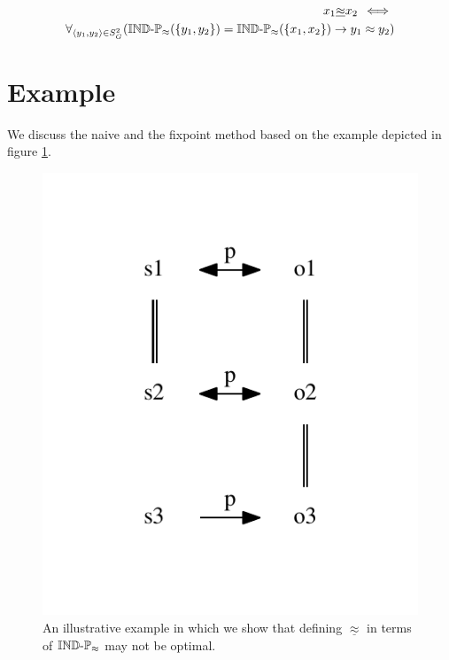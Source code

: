 \documentclass[a4paper]{article}
\begin{document}
\begin{definition}
\begin{align}
\label{def:lower_approximation1}
  x_1 \underline{\approx} x_2
\, \iff \,\\
  \forall_{\langle y_1,y_2\rangle \in S_G^2}(
      \operatorname{{\mathbb{IND}-\mathbb{P}}}_{\approx}(\{y_1,y_2\}) = \operatorname{{\mathbb{IND}-\mathbb{P}}}_{\approx}(\{x_1,x_2\})
    \rightarrow
      y_1 \approx y_2
  )
\end{align}
\end{definition}



\section{Example}
\label{sec:example}

We discuss the naive and the fixpoint method based on the example
  depicted in figure \ref{fig:example}.

\begin{figure}
\label{fig:example}
\centering
\includegraphics{./img/fixpoint_example}%
\caption{
  An illustrative example in which we show that defining
  $\underline{\approx}$ in terms of $\operatorname{{\mathbb{IND}-\mathbb{P}}}_{\approx}$ may not be optimal.
}
\end{figure}
\end{document}

